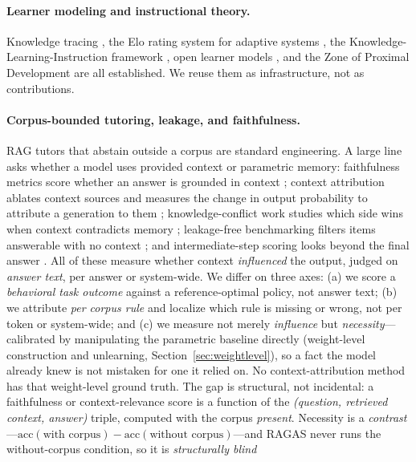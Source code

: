 \documentclass{article}
\begin{document}
\paragraph{Learner modeling and instructional theory.} Knowledge tracing
\citep{corbett1994bkt}, the Elo rating system for adaptive systems \citep{pelanek2016}, the
Knowledge-Learning-Instruction framework \citep{koedinger2012kli}, open learner models
\citep{bull2007olm}, and the Zone of Proximal Development \citep{vygotsky1978} are all
established. We reuse them as infrastructure, not as contributions.

\paragraph{Corpus-bounded tutoring, leakage, and faithfulness.} RAG tutors that abstain
outside a corpus are standard engineering. A large line asks whether a model uses provided
context or parametric memory: faithfulness metrics score whether an answer is grounded in
context \citep{ragas2023}; context attribution ablates context sources and measures the
change in output probability to attribute a generation to them \citep{contextcite2024,
priordominance2026}; knowledge-conflict work studies which side wins when context contradicts
memory \citep{knowledgeconflicts2024, faithfulrag2025}; leakage-free benchmarking filters
items answerable with no context \citep{seedrg2026}; and intermediate-step scoring looks
beyond the final answer \citep{cuer2026}. All of these measure whether context
\emph{influenced} the output, judged on \emph{answer text}, per answer or system-wide. We
differ on three axes: (a) we score a \emph{behavioral task outcome} against a reference-optimal
policy, not answer text; (b) we attribute \emph{per corpus rule} and localize which rule is
missing or wrong, not per token or system-wide; and (c) we measure not merely \emph{influence}
but \emph{necessity}---calibrated by manipulating the parametric baseline directly (weight-level
construction and unlearning, Section~\ref{sec:weightlevel}), so a fact the model already knew is
not mistaken for one it relied on. No context-attribution method has that weight-level ground
truth. The gap is structural, not incidental: a faithfulness or context-relevance score is a
function of the \emph{(question, retrieved context, answer)} triple, computed with the corpus
\emph{present}. Necessity is a \emph{contrast}---$\mathrm{acc}(\text{with corpus})-\mathrm{acc}(\text{without
corpus})$---and RAGAS never runs the without-corpus condition, so it is \emph{structurally blind}
\end{document}
